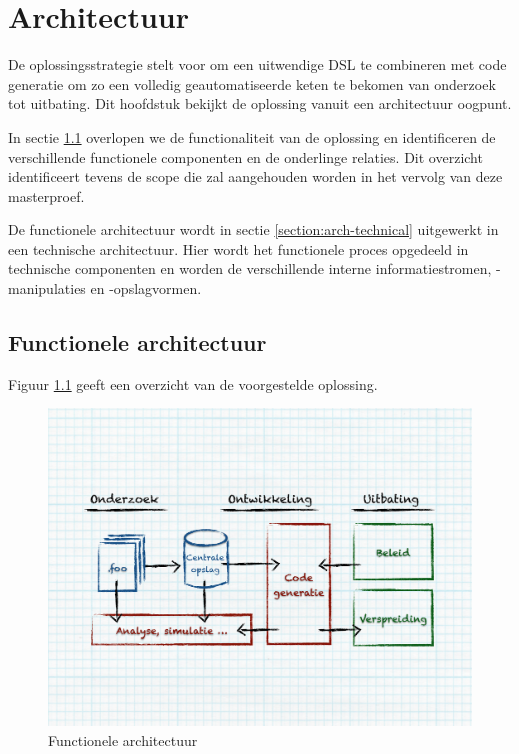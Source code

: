 
\chapter{Architectuur}
\label{chapter:architectuur}

De oplossingsstrategie stelt voor om een uitwendige DSL te combineren met code
generatie om zo een volledig geautomatiseerde keten te bekomen van onderzoek
tot uitbating. Dit hoofdstuk bekijkt de oplossing vanuit een architectuur
oogpunt.

In sectie \ref{section:arch-functional} overlopen we de functionaliteit van de
oplossing en identificeren de verschillende functionele componenten en de
onderlinge relaties. Dit overzicht identificeert tevens de scope die zal
aangehouden worden in het vervolg van deze masterproef.

De functionele architectuur wordt in sectie \ref{section:arch-technical}
uitgewerkt in een technische architectuur. Hier wordt het functionele proces
opgedeeld in technische componenten en worden de verschillende interne
informatiestromen, -manipulaties en -opslagvormen.

\section{Functionele architectuur}
\label{section:arch-functional}

Figuur \ref{fig:arch-functional} geeft een overzicht van de voorgestelde
oplossing.

\begin{figure}[ht]
  \centering
  \includegraphics[width=0.9\linewidth]{resources/arch-functional.pdf}
  \caption{Functionele architectuur}
  \label{fig:arch-functional}
\end{figure}

